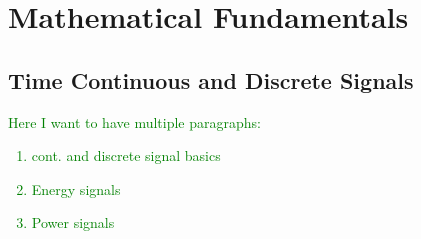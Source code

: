 





\section{Mathematical Fundamentals}
\label{mathematicalFundamentals}



\subsection{Time Continuous  and Discrete Signals}
\label{contSignal}
\textcolor{green}{
	Here I want to have multiple paragraphs:
	\begin{enumerate}
  		\item cont. and discrete signal basics  
  		\item Energy signals
  		\item Power signals
	\end{enumerate}
}


